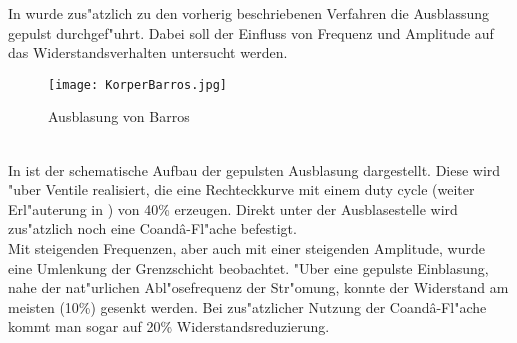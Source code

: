 In \cite{Barros.2016} wurde zus"atzlich zu den vorherig beschriebenen Verfahren die Ausblassung gepulst durchgef"uhrt. Dabei soll der Einfluss von Frequenz und Amplitude auf das Widerstandsverhalten untersucht werden.
\begin{figure}[h]
	\centering
	\texttt{[image: KorperBarros.jpg]}
	\caption{Ausblasung von Barros \cite{Barros.2016}}
	\label{fig:Barros}
\end{figure}\\
In  ist der schematische Aufbau der gepulsten Ausblasung dargestellt. Diese wird "uber Ventile realisiert, die eine Rechteckkurve mit einem duty cycle (weiter Erl"auterung in ) von 40\% erzeugen. Direkt unter der Ausblasestelle wird zus"atzlich noch eine Coand\^{a}-Fl"ache befestigt.\\
Mit steigenden Frequenzen, aber auch mit einer steigenden Amplitude, wurde eine Umlenkung der Grenzschicht beobachtet. "Uber eine gepulste Einblasung, nahe der nat"urlichen Abl"osefrequenz der Str"omung, konnte der Widerstand am meisten (10\%) gesenkt werden. Bei zus"atzlicher Nutzung der Coand\^{a}-Fl"ache kommt man sogar auf 20\% Widerstandsreduzierung.

